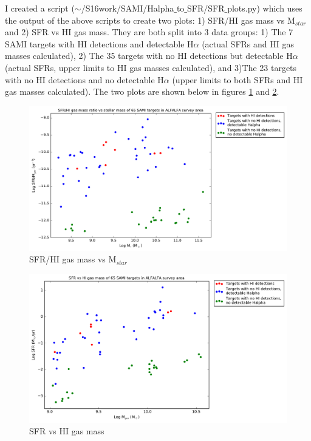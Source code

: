 \documentclass[10pt,letterpaper]{article}
\begin{document}
I created a script ($\sim$/S16work/SAMI/Halpha$\_$to$\_$SFR/SFR$\_$plots.py) which uses the output of the above scripts to create two plots: 1) SFR/HI gas mass vs M$_{star}$ and 2) SFR vs HI gas mass. They are both split into 3 data groups: 1) The 7 SAMI targets with HI detections and detectable H$\alpha$ (actual SFRs and HI gas masses calculated), 2) The 35 targets with no HI detections but detectable H$\alpha$ (actual SFRs, upper limits to HI gas masses calculated), and 3)The 23 targets with no HI detections and no detectable H$\alpha$ (upper limits to both SFRs and HI gas masses calculated). The two plots are shown below in figures \ref{fig: SFR/HI gas mass vs Mstar} and \ref{fig: SFR vs HI gas mass}.\\

\begin{figure}[h!]
\center
\caption{SFR/HI gas mass vs M$_{star}$}\label{fig: SFR/HI gas mass vs Mstar}
\includegraphics[scale=0.4]{figures/SFR_HI_gas_mass_ratio_vs_Mstar.pdf}
\end{figure}

\begin{figure}[h!]
\center
\caption{SFR vs HI gas mass}\label{fig: SFR vs HI gas mass}
\includegraphics[scale=0.4]{figures/SFR_vs_HI_gas_mass.pdf}
\end{figure}
\end{document}
